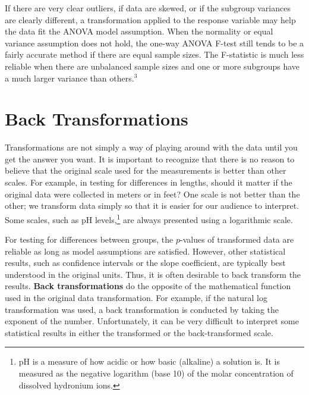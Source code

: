 \documentclass[
]{report}
\begin{document}
\begin{quote}
\begin{enumerate}
\end{enumerate}
\end{quote}

If there are very clear outliers, if data are skewed, or if the subgroup variances are clearly different, a transformation applied to the response variable may help the data fit the ANOVA model assumption. When the normality or equal variance assumption does not hold, the one-way ANOVA F-test still tends to be a fairly accurate method if there are equal sample sizes. The F-statistic is much less reliable when there are unbalanced sample sizes and one or more subgroups have a much larger variance than others.\(^3\)

\section*{Back Transformations}\label{back-transformations}

Transformations are not simply a way of playing around with the data until you get the answer you want. It is important to recognize that there is no reason to believe that the original scale used for the measurements is better than other scales. For example, in testing for differences in lengths, should it matter if the original data were collected in meters or in feet? One scale is not better than the other; we transform data simply so that it is easier for our audience to interpret. Some scales, such as pH levels,\footnote{pH is a measure of how acidic or how basic (alkaline) a solution is. It is measured as the negative logarithm (base 10) of the molar concentration of dissolved hydronium ions.} are always presented using a logarithmic scale.

For testing for differences between groups, the \(p\)-values of transformed data are reliable as long as model assumptions are satisfied. However, other statistical results, such as confidence intervals or the slope coefficient, are typically best understood in the original units. Thus, it is often desirable to back transform the results. \textbf{Back transformations} do the opposite of the mathematical function used in the original data transformation. For example, if the natural log transformation was used, a back transformation is conducted by taking the exponent of the number. Unfortunately, it can be very difficult to interpret some statistical results in either the transformed or the back-transformed scale.
\end{document}
